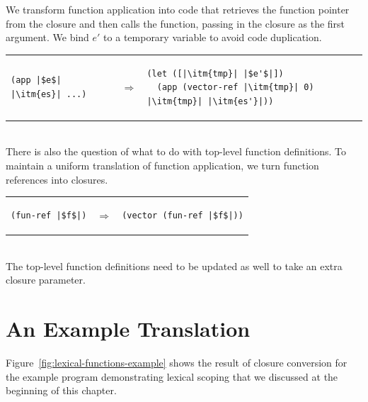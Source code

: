 \documentclass[11pt]{book}
\begin{document}
We transform function application into code that retrieves the
function pointer from the closure and then calls the function, passing
in the closure as the first argument. We bind $e'$ to a temporary
variable to avoid code duplication.

\begin{tabular}{lll}
\begin{minipage}{0.3\textwidth}
\begin{lstlisting}
(app |$e$| |\itm{es}| ...)
\end{lstlisting}
\end{minipage}
&
$\Rightarrow$
&
\begin{minipage}{0.5\textwidth}
\begin{lstlisting}
(let ([|\itm{tmp}| |$e'$|])
  (app (vector-ref |\itm{tmp}| 0) |\itm{tmp}| |\itm{es'}|))
\end{lstlisting}
\end{minipage}
\end{tabular}  \\

There is also the question of what to do with top-level function
definitions. To maintain a uniform translation of function
application, we turn function references into closures.

\begin{tabular}{lll}
\begin{minipage}{0.3\textwidth}
\begin{lstlisting}
(fun-ref |$f$|)
\end{lstlisting}
\end{minipage}
&
$\Rightarrow$
&
\begin{minipage}{0.5\textwidth}
\begin{lstlisting}
(vector (fun-ref |$f$|))
\end{lstlisting}
\end{minipage}
\end{tabular}  \\
%
The top-level function definitions need to be updated as well to take
an extra closure parameter.

\section{An Example Translation}
\label{sec:example-lambda}

Figure~\ref{fig:lexical-functions-example} shows the result of closure
conversion for the example program demonstrating lexical scoping that
we discussed at the beginning of this chapter.
\end{document}
